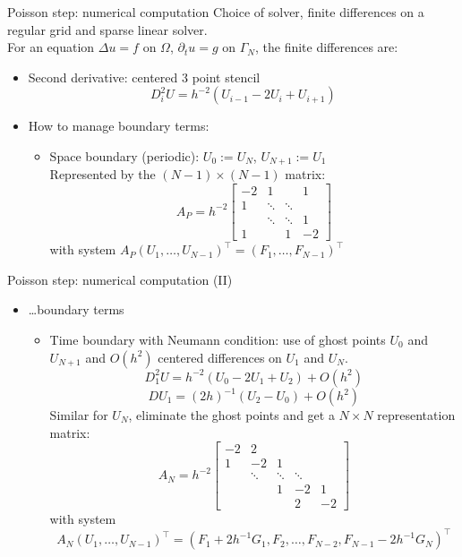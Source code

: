 \documentclass{beamer}
\begin{document}
\begin{frame}{Poisson step: numerical computation}
Choice of solver, finite differences on a regular grid and sparse linear solver.\\
For an equation $\Delta u = f$ on $\Omega$, $\partial_t u=g$ on $\Gamma_N$, the finite differences are:
\begin{itemize}
    \item Second derivative: centered 3 point stencil $$D_i^2U = h^{-2}(U_{i-1}-2U_i+U_{i+1})$$
    \item How to manage boundary terms:
    \begin{itemize}
        \item Space boundary (periodic): $U_0:=U_N$, $U_{N+1}:=U_1$ \\
        Represented by the $(N-1)\times (N-1)$ matrix:
        $$ A_P = 
        h^{-2}\begin{bmatrix}
            -2 & 1 &  & 1 \\
            1 & \ddots & \ddots &  \\
             & \ddots & \ddots & 1 \\
            1 &  & 1 & -2 
        \end{bmatrix}  $$
        with system $A_P (U_1,\dots,U_{N-1})^\top = (F_1,\dots,F_{N-1})^\top$
    \end{itemize}
\end{itemize}
\end{frame}

\begin{frame}{Poisson step: numerical computation (II)}
\begin{itemize}
    \item \dots boundary terms
    \begin{itemize}
        \item Time boundary with Neumann condition: use of ghost points $U_0$ and $U_{N+1}$ and $O(h^2)$ centered differences on $U_1$ and $U_N$. 
        $$D_1^2U = h^{-2}(U_{0}-2U_1+U_{2}) + O(h^2)$$
        $$DU_1 = (2h)^{-1}(U_{2}-U_0) + O(h^2)$$
        Similar for $U_N$, eliminate the ghost points and get a $N\times N$ representation matrix:
        $$ A_N = h^{-2}\begin{bmatrix}
               -2 & 2  &    &   & \\
                1 & -2 & 1  &   & \\
                  & \ddots  & \ddots & \ddots & \\
                  &    & 1  & -2 & 1  \\
                  &    &    & 2 & -2
            \end{bmatrix}  $$
            with system $$A_N (U_1,\dots,U_{N-1})^\top = (F_1+2h^{-1}G_1,F_2,\dots,F_{N-2},F_{N-1}-2h^{-1}G_N)^\top$$
    \end{itemize}

\end{itemize}
\end{frame}
\end{document}
